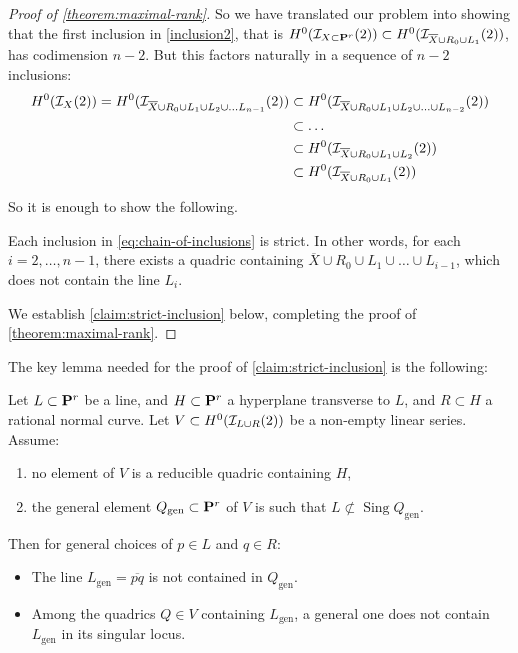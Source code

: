 \documentclass[11pt, two side, letterpaper, final]{amsart}
\renewcommand{\P}{{\bf P}}
\DeclareMathOperator{\Sing}{Sing}
\begin{document}
\begin{proof}[Proof of \cref{theorem:maximal-rank}]
So we have translated our problem into showing that the first inclusion in \eqref{inclusion2},
that is	$H^0(\sh{I}_{X \subset \P^r}(2)) \subset H^0(\sh{I}_{\overline{X} \cup R_0 \cup L_1}(2))$,
has codimension $n-2$. But this factors naturally in a sequence of $n-2$ inclusions:
\begin{equation}
\label{eq:chain-of-inclusions}
\begin{split}
	H^0({\mathcal I}_{X}(2))=H^0({\mathcal I}_{\overline{X} \cup R_0 \cup L_1 \cup L_2 \cup \ldots L_{n-1}}(2)) 
	&\subset H^0({\mathcal I}_{\overline{X} \cup R_0 \cup L_1 \cup L_2 \cup \ldots \cup L_{n-2}}(2)) \\
	&\subset \ldots\\
	&\subset H^0({\mathcal I}_{\overline{X} \cup R_0 \cup L_1 \cup L_2}(2))  \\
	&\subset H^0({\mathcal I}_{\overline{X} \cup R_0 \cup L_1}(2)) 
\end{split}
\end{equation}

So it is enough to show the following.
\begin{proposition}
\label{claim:strict-inclusion}
Each inclusion in \eqref{eq:chain-of-inclusions} is strict. 
In other words, 
for each $i=2, \ldots, n-1$, there exists a quadric containing 
$\overline{X} \cup R_0 \cup L_1 \cup \ldots \cup L_{i-1}$,
which does not contain the line $L_i$.
\end{proposition}

 We establish \cref{claim:strict-inclusion} below, completing the proof of
 \cref{theorem:maximal-rank}.
\end{proof}



The key lemma needed for the proof of \cref{claim:strict-inclusion}  is the following:
\begin{lemma}
\label{lemma:induction-step-join}
Let $L \subset \P^r$ be a line, and $H\subset \P^r$ a 
hyperplane transverse to $L$, and $R \subset H$ a rational normal curve.
Let $V \subset H^0({\mathcal I}_{L \cup R}(2))$ be a non-empty linear
series. Assume:
\begin{enumerate}[label=(\alph*)]
	\item \label{condition:irreducible-quadric} no element of $V$ is a reducible quadric containing $H$,
	\item the general element $Q_\text{gen} \subset \P^r$ of $V$ is such that
	$L \not\subset \Sing Q_\text{gen}$.
\end{enumerate}
Then for general choices of $p\in L$ and $q \in R$:
\begin{itemize}
\item The line $L_\text{gen} = \overline{pq}$
is not contained in $Q_\text{gen}$. 
\item Among the quadrics $Q \in V$ containing
$L_\text{gen}$, a general one does not contain $L_\text{gen}$ in its singular locus.
\end{itemize}
\end{lemma}
\end{document}
